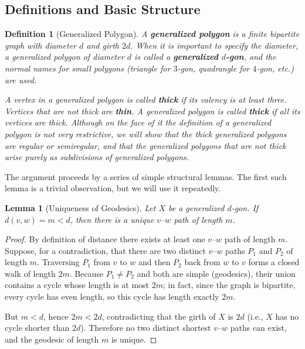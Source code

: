 \documentclass[12pt,a4paper,openany]{book}
\newtheorem{definition}{Definition}[section]
\newtheorem{lemma}{Lemma}[section]
\begin{document}
\subsection{Definitions and Basic Structure}

\begin{definition}[Generalized Polygon]
A \textbf{generalized polygon} is a finite bipartite graph with diameter $d$ and girth $2d$. When it is important to specify the diameter, a generalized polygon of diameter $d$ is called a \textbf{generalized $d$-gon}, and the normal names for small polygons (triangle for $3$-gon, quadrangle for $4$-gon, etc.) are used.

A vertex in a generalized polygon is called \textbf{thick} if its valency is at least three. Vertices that are not thick are \textbf{thin}. A generalized polygon is called \textbf{thick} if all its vertices are thick. Although on the face of it the definition of a generalized polygon is not very restrictive, we will show that the thick generalized polygons are regular or semiregular, and that the generalized polygons that are not thick arise purely as subdivisions of generalized polygons.
\end{definition}

The argument proceeds by a series of simple structural lemmas. The first such lemma is a trivial observation, but we will use it repeatedly.

\begin{lemma}[Uniqueness of Geodesics]\label{lem:unique-geodesic}
Let $X$ be a generalized $d$-gon.
If $d(v,w)=m<d$, then there is a unique $v$--$w$ path of length $m$.
\end{lemma}

\begin{proof}
By definition of distance there exists at least one $v$--$w$ path of length $m$.
Suppose, for a contradiction, that there are two distinct $v$--$w$ paths $P_1$ and $P_2$ of length $m$.
Traversing $P_1$ from $v$ to $w$ and then $P_2$ back from $w$ to $v$ forms a closed walk of length $2m$.
Because $P_1\neq P_2$ and both are simple (geodesics), their union contains a cycle whose length is at most $2m$; in fact, since the graph is bipartite, every cycle has even length, so this cycle has length exactly $2m$.

But $m<d$, hence $2m<2d$, contradicting that the girth of $X$ is $2d$ (i.e., $X$ has no cycle shorter than $2d$).
Therefore no two distinct shortest $v$--$w$ paths can exist, and the geodesic of length $m$ is unique.
\end{proof}
\end{document}
